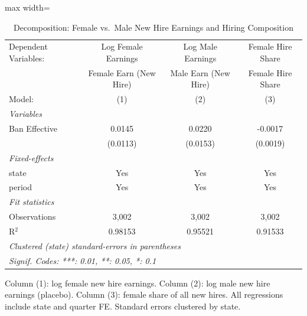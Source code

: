 
\begin{table}[htbp]
   \caption{\label{tab:decomp} Decomposition: Female vs.~Male New Hire Earnings and Hiring Composition}
   \centering
   \begin{adjustbox}{max width=\textwidth}
   \begin{tabular}{lccc}
      \tabularnewline \midrule \midrule
      Dependent Variables: & Log Female Earnings    & Log Male Earnings    & Female Hire Share\\  
                           & Female Earn (New Hire) & Male Earn (New Hire) & Female Hire Share \\   
      Model:               & (1)                    & (2)                  & (3)\\  
      \midrule
      \emph{Variables}\\
      Ban Effective        & 0.0145                 & 0.0220               & -0.0017\\   
                           & (0.0113)               & (0.0153)             & (0.0019)\\   
      \midrule
      \emph{Fixed-effects}\\
      state                & Yes                    & Yes                  & Yes\\  
      period               & Yes                    & Yes                  & Yes\\  
      \midrule
      \emph{Fit statistics}\\
      Observations         & 3,002                  & 3,002                & 3,002\\  
      R$^2$                & 0.98153                & 0.95521              & 0.91533\\  
      \midrule \midrule
      \multicolumn{4}{l}{\emph{Clustered (state) standard-errors in parentheses}}\\
      \multicolumn{4}{l}{\emph{Signif. Codes: ***: 0.01, **: 0.05, *: 0.1}}\\
   \end{tabular}
   \end{adjustbox}

   \par \raggedright 
   Column (1): log female new hire earnings. Column (2): log male new hire earnings (placebo). Column (3): female share of all new hires. All regressions include state and quarter FE. Standard errors clustered by state.
\end{table}


